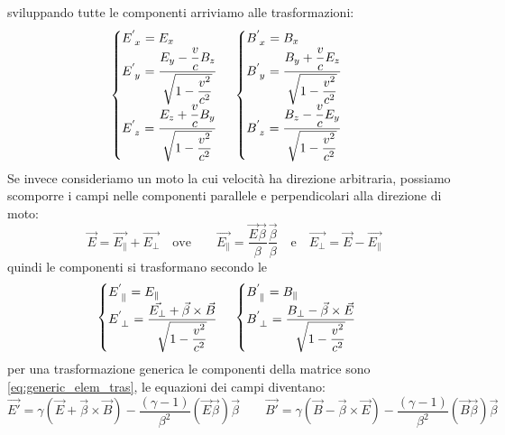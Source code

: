 sviluppando tutte le componenti arriviamo alle trasformazioni: 
\begin{equation}
    \begin{cases}
    E\indices{^'_x}=E_x
    \\
    E\indices{^'_y}=\dfrac{E_y-\dfrac{v}{c}B_z}{\sqrt{1-\dfrac{v^2}{c^2}}}
    \\
     E\indices{^'_z}=\dfrac{E_z+\dfrac{v}{c}B_y}{\sqrt{1-\dfrac{v^2}{c^2}}}
    \end{cases}\,
  \begin{cases}
   B\indices{^'_x}=B_x
    \\
    B\indices{^'_y}=\dfrac{B_y+\dfrac{v}{c}E_z}{\sqrt{1-\dfrac{v^2}{c^2}}}
    \\
     B\indices{^'_z}=\dfrac{B_z-\dfrac{v}{c}E_y}{\sqrt{1-\dfrac{v^2}{c^2}}}
    \end{cases}\,
\end{equation}
Se invece consideriamo un moto la cui velocità ha direzione arbitraria, possiamo scomporre i campi nelle componenti parallele e perpendicolari alla direzione di moto:
\begin{equation*}
    \Vec{E}=\Vec{E_\parallel}+\Vec{E_\perp} \quad \text{ove}
    \qquad\Vec{E_\parallel}=\dfrac{\Vec{E}\Vec{\beta}}{\beta}\dfrac{\Vec{\beta}}{\beta}\quad\text{e}\quad
    \Vec{E_\perp}=\Vec{E}-\Vec{E_\parallel}
\end{equation*}
quindi le componenti si trasformano secondo le
\begin{equation}
    \begin{cases}
    E\indices{^'_\parallel}=E_\parallel
    \\
    E\indices{^'_\perp}=\dfrac{\Vec{E_\perp}+\Vec{\beta}\times\Vec{B}}{\sqrt{1-\dfrac{v^2}{c^2}}}
    \end{cases}\,
  \begin{cases}
   B\indices{^'_\parallel}=B_\parallel
    \\
    B\indices{^'_\perp}=\dfrac{B_\perp-\Vec{\beta}\times\Vec{E}}{\sqrt{1-\dfrac{v^2}{c^2}}}
    \end{cases}\,
\end{equation}
per una trasformazione generica le componenti della matrice sono \eqref{eq:generic_elem_tras}, le equazioni dei campi diventano:
\begin{equation}\label{eq:Campi_genric}
    \Vec{E'}=\gamma(\Vec{E}+\Vec{\beta}\times\Vec{B})-\dfrac{(\gamma -1)}{\beta^2}(\Vec{E}\Vec{\beta})\Vec{\beta} \qquad \Vec{B'}=\gamma(\Vec{B}-\Vec{\beta}\times\Vec{E})-\dfrac{(\gamma -1)}{\beta^2}(\Vec{B}\Vec{\beta})\Vec{\beta}
\end{equation}
